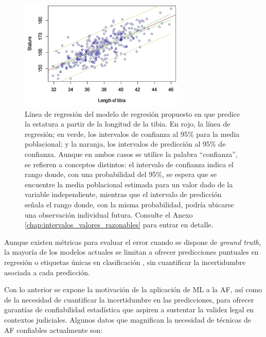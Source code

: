 \begin{figure}[h]
    \centering
    \includegraphics[width=0.7\textwidth]{capitulos/cap_01/imagenes/regression_line_lentibia_stature.png}
    \caption[
        Línea de regresión del modelo de regresión propuesto en \cite{verma2020} que predice la estatura a partir de la longitud de la tibia.
    ]{
        Línea de regresión del modelo de regresión propuesto en \cite{verma2020} que predice la estatura a partir de la longitud de la tibia. En rojo, la línea de regresión; en verde, los intervalos de confianza al 95\% para la media poblacional; y la naranja, los intervalos de predicción al 95\% de confianza. Aunque en ambos casos se utilice la palabra ``confianza'', se refieren a conceptos distintos: el intervalo de confianza indica el rango donde, con una probabilidad del 95\%, se espera que se encuentre la media poblacional estimada para un valor dado de la variable independiente, mientras que el intervalo de predicción señala el rango donde, con la misma probabilidad, podría ubicarse una observación individual futura. Consulte el Anexo \ref{chap:intervalos_valores_razonables} para entrar en detalle.
    } 
    \label{fig:regression_lentibia_stature}
\end{figure}

Aunque existen métricas para evaluar el error cuando se dispone de \textit{ground truth}, la mayoría de los modelos actuales se limitan a ofrecer predicciones puntuales en regresión \cite{park2024, imaizumi2021, stepanovsky2024} o etiquetas únicas en clasificación \cite{venema2022, park2024}, sin cuantificar la incertidumbre asociada a cada predicción.

Con lo anterior se expone la motivación de la aplicación de \acrshort{ML} a la \acrshort{AF}, así como de la necesidad de cuantificar la incertidumbre en las predicciones, para ofrecer garantías de confiabilidad estadística que aspiren a sustentar la validez legal en contextos judiciales. Algunos datos que magnifican la necesidad de técnicas de \acrshort{AF} confiables actualmente son:

